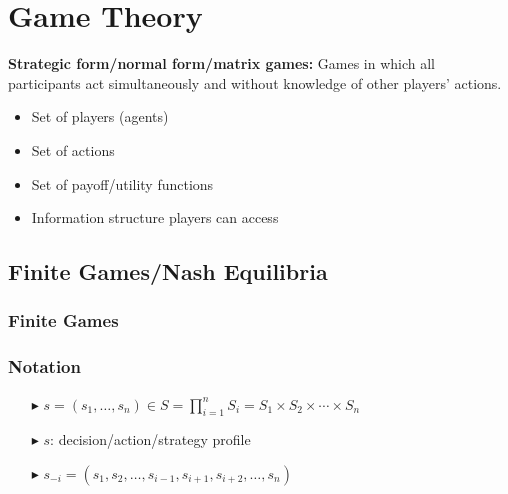 \documentclass[../Main.tex]{subfiles}
\begin{document}
\chapter{Game Theory}
\textbf{Strategic form/normal form/matrix games:} Games in which all participants act simultaneously and without knowledge of other players' actions.
\begin{itemize}
    \item Set of players (agents)
    \item Set of actions 
    \item Set of payoff/utility functions
    \item Information structure players can access
\end{itemize}

\section{Finite Games/Nash Equilibria}
\subsection{Finite Games}

\subsection*{Notation}
\begin{itemize}
    \item[$\blacktriangleright$] $s = (s_1, \ldots, s_n) \in S = \prod_{i=1}^n S_i = S_1 \times S_2 \times \cdots \times S_n$
    \item[$\blacktriangleright$] $s$: decision/action/strategy profile
    \item[$\blacktriangleright$] $s_{-i} = (s_1, s_2, \ldots, s_{i-1}, s_{i+1}, s_{i+2}, \ldots, s_n)$
\end{itemize}
\end{document}
